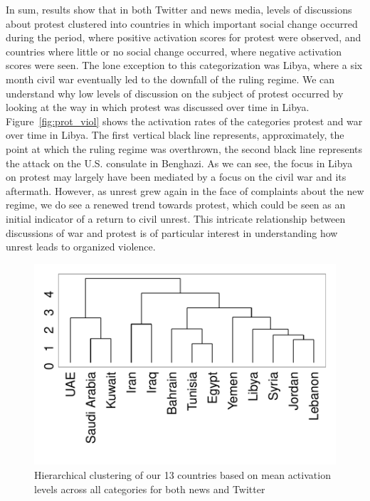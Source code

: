 In sum, results show that in both Twitter and news media, levels of discussions about protest clustered into countries in which important social change occurred during the period, where positive activation scores for protest were observed, and countries where little or no social change occurred, where negative activation scores were seen. The lone exception to this categorization was Libya, where a six month civil war eventually led to the downfall of the ruling regime. We can understand why low levels of discussion on the subject of protest occurred by looking at the way in which protest was discussed over time in Libya. Figure~\ref{fig:prot_viol} shows the activation rates of the categories protest and war over time in Libya. The first vertical black line represents, approximately, the point at which the ruling regime was overthrown, the second black line represents the attack on the U.S. consulate in Benghazi.  As we can see, the focus in Libya on protest may largely have been mediated by a focus on the civil war and its aftermath.  However, as unrest grew again in the face of complaints about the new regime, we do see a renewed trend towards protest, which could be seen as an initial indicator of a return to civil unrest.  This intricate relationship between discussions of war and protest is of particular interest in understanding how unrest leads to organized violence.
 
\begin{figure}[t]
	\centering
	\includegraphics[width=.5\textwidth]{imgs/country_dendro}
	\caption{Hierarchical clustering of our 13 countries based on mean activation levels across all categories for both news and Twitter }
	\label{fig:clust}
\end{figure}

